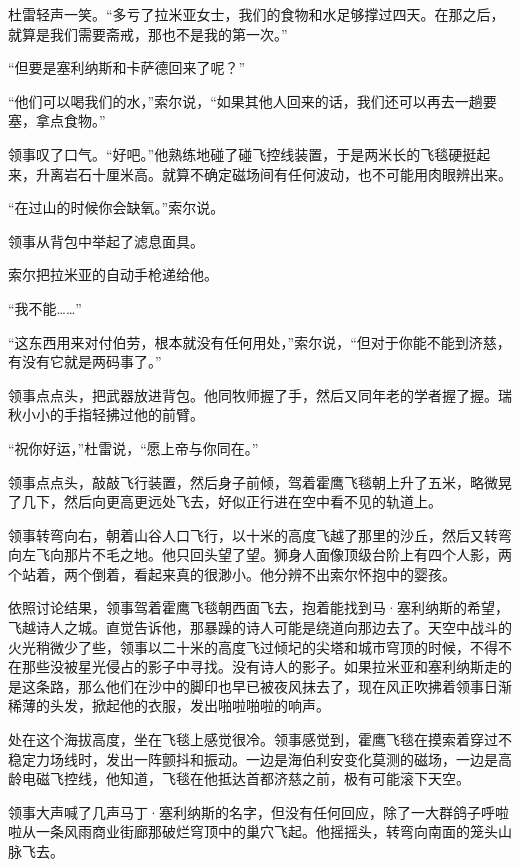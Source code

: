 \documentclass[AutoFakeBold=true]{book}
\begin{document}
杜雷轻声一笑。``多亏了拉米亚女士，我们的食物和水足够撑过四天。在那之后，就算是我们需要斋戒，那也不是我的第一次。''

``但要是塞利纳斯和卡萨德回来了呢？''

``他们可以喝我们的水，''索尔说，``如果其他人回来的话，我们还可以再去一趟要塞，拿点食物。''

领事叹了口气。``好吧。''他熟练地碰了碰飞控线装置，于是两米长的飞毯硬挺起来，升离岩石十厘米高。就算不确定磁场间有任何波动，也不可能用肉眼辨出来。

``在过山的时候你会缺氧。''索尔说。

领事从背包中举起了滤息面具。

索尔把拉米亚的自动手枪递给他。

``我不能……''

``这东西用来对付伯劳，根本就没有任何用处，''索尔说，``但对于你能不能到济慈，有没有它就是两码事了。''

领事点点头，把武器放进背包。他同牧师握了手，然后又同年老的学者握了握。瑞秋小小的手指轻拂过他的前臂。

``祝你好运，''杜雷说，``愿上帝与你同在。''

领事点点头，敲敲飞行装置，然后身子前倾，驾着霍鹰飞毯朝上升了五米，略微晃了几下，然后向更高更远处飞去，好似正行进在空中看不见的轨道上。

领事转弯向右，朝着山谷人口飞行，以十米的高度飞越了那里的沙丘，然后又转弯向左飞向那片不毛之地。他只回头望了望。狮身人面像顶级台阶上有四个人影，两个站着，两个倒着，看起来真的很渺小。他分辨不出索尔怀抱中的婴孩。

\vspace*{1em}

依照讨论结果，领事驾着霍鹰飞毯朝西面飞去，抱着能找到马·塞利纳斯的希望，飞越诗人之城。直觉告诉他，那暴躁的诗人可能是绕道向那边去了。天空中战斗的火光稍微少了些，领事以二十米的高度飞过倾圮的尖塔和城市穹顶的时候，不得不在那些没被星光侵占的影子中寻找。没有诗人的影子。如果拉米亚和塞利纳斯走的是这条路，那么他们在沙中的脚印也早已被夜风抹去了，现在风正吹拂着领事日渐稀薄的头发，掀起他的衣服，发出啪啦啪啦的响声。

处在这个海拔高度，坐在飞毯上感觉很冷。领事感觉到，霍鹰飞毯在摸索着穿过不稳定力场线时，发出一阵颤抖和振动。一边是海伯利安变化莫测的磁场，一边是高龄电磁飞控线，他知道，飞毯在他抵达首都济慈之前，极有可能滚下天空。

领事大声喊了几声马丁·塞利纳斯的名字，但没有任何回应，除了一大群鸽子呼啦啦从一条风雨商业街廊那破烂穹顶中的巢穴飞起。他摇摇头，转弯向南面的笼头山脉飞去。
\end{document}
